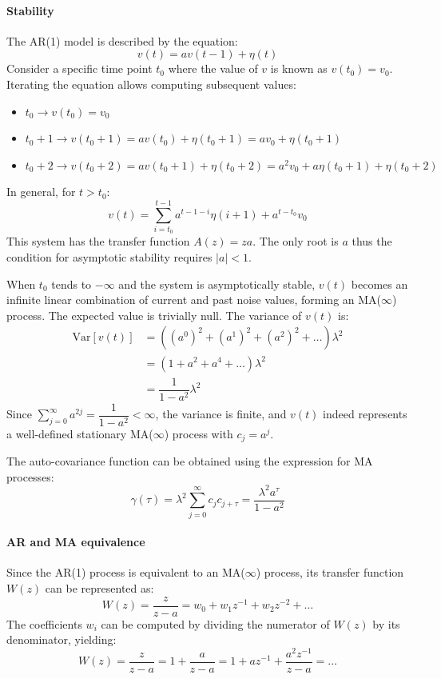 \paragraph*{Stability}
The AR(1) model is described by the equation:
\[v(t) = av(t-1) + \eta(t)\]
Consider a specific time point $t_0$ where the value of $v$ is known as $v(t_0) = v_0$.
Iterating the equation allows computing subsequent values:
\begin{itemize}
    \item $t_0 \rightarrow v(t_0) = v_0$
    \item $t_0+1 \rightarrow v(t_0+1) = av(t_0) + \eta(t_0+1) = av_0 + \eta(t_0+1)$
    \item $t_0+2 \rightarrow v(t_0+2) = av(t_0+1) + \eta(t_0+2) = a^2v_0 + a\eta(t_0+1) + \eta(t_0+2)$
\end{itemize}
In general, for $t > t_0$: 
\[v(t)=\sum_{i=t_0}^{t-1}a^{t-1-i}\eta(i+1)+a^{t-t_0}v_0\]
This system has the transfer function $A(z)=za$. 
The only root is $a$ thus the condition for asymptotic stability requires $\left\lvert a \right\rvert < 1$. 

When $t_0$ tends to $-\infty$ and the system is asymptotically stable, $v(t)$ becomes an infinite linear combination of current and past noise values, forming an MA($\infty$) process. 
The expected value is trivially null.
The variance of $v(t)$ is: 
\begin{align*}
    \text{Var}\left[v(t)\right] &= \left( (a^0)^2+(a^1)^2+(a^2)^2+\dots \right) \lambda^2 \\
                                &= \left( 1+a^2+a^4+\dots \right) \lambda^2 \\
                                &= \dfrac{1}{1-a^2} \lambda^2
\end{align*}
Since $\sum_{j=0}^{\infty}a^{2j}=\dfrac{1}{1-a^2}<\infty$, the variance is finite, and $v(t)$ indeed represents a well-defined stationary MA($\infty$) process with $c_j = a^j$. 

The auto-covariance function can be obtained using the expression for MA processes:
\[\gamma(\tau)=\lambda^2\sum_{j=0}^{\infty}c_jc_{j+\tau}=\dfrac{\lambda^2a^\tau}{1-a^2}\]

\paragraph*{AR and MA equivalence}
Since the AR(1) process is equivalent to an MA($\infty$) process, its transfer function $W(z)$ can be represented as:
\[W(z)=\dfrac{z}{z-a}=w_0+w_1z^{-1}+w_2z^{-2}+\dots\]
The coefficients $w_i$ can be computed by dividing the numerator of $W(z)$ by its denominator, yielding:
\[W(z)=\dfrac{z}{z-a}=1+\dfrac{a}{z-a}=1+az^{-1}+\dfrac{a^2z^{-1}}{z-a}=\dots\]

